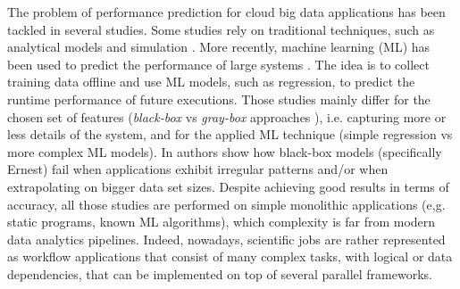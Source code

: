 \documentclass[a4paper, 10pt, conference]{ieeeconf}      %
\begin{document}
The problem of performance prediction for cloud big data applications has been tackled in several studies. Some  studies rely on traditional techniques, such as analytical models \cite{lundstrom2004, ardagna1, vianna2013} and simulation \cite{Verma2011}.   More recently, machine learning (ML) has been used to predict the performance of large systems \cite{ernest, pan2017hemingway, alipourfard2017cherrypick, ARDAGNA2019}.
The idea is to collect training data offline and use ML models, such as regression, to predict the runtime performance of future executions.
Those studies mainly differ for the chosen set of features (\textit{black-box} vs \textit{gray-box} approaches %
), i.e. capturing more or less details of the system,  and for the applied ML technique (simple regression vs more complex ML models). In \cite{ARDAGNA2019} authors show how black-box models (specifically Ernest) fail when applications exhibit irregular patterns and/or when extrapolating on bigger data set sizes.
Despite achieving good results in terms of accuracy, all those studies are performed on simple monolithic applications (e,g. static programs, known ML algorithms), which complexity is far from modern data analytics pipelines.
Indeed, nowadays, scientific jobs are rather represented as workflow applications that consist of many complex tasks, with logical or data dependencies, that can be implemented on top of several parallel frameworks. \cite{atkinson2017scientific, warr2012scientific, lordan2014servicess} 


\end{document}
